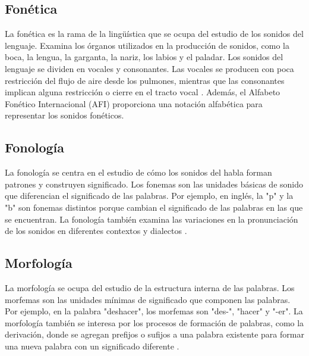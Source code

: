 \documentclass{book}
\begin{document}
\subsection{Fonética}

La fonética es la rama de la lingüística que se ocupa del estudio de los sonidos del lenguaje. Examina los órganos utilizados en la producción de sonidos, como la boca, la lengua, la garganta, la nariz, los labios y el paladar. Los sonidos del lenguaje se dividen en vocales y consonantes. Las vocales se producen con poca restricción del flujo de aire desde los pulmones, mientras que las consonantes implican alguna restricción o cierre en el tracto vocal \cite{JohnsonMLSS, fromkin2018introduction}. Además, el Alfabeto Fonético Internacional (AFI) proporciona una notación alfabética para representar los sonidos fonéticos.

\subsection{Fonología}

La fonología se centra en el estudio de cómo los sonidos del habla forman patrones y construyen significado. Los fonemas son las unidades básicas de sonido que diferencian el significado de las palabras. Por ejemplo, en inglés, la "p" y la "b" son fonemas distintos porque cambian el significado de las palabras en las que se encuentran. La fonología también examina las variaciones en la pronunciación de los sonidos en diferentes contextos y dialectos \cite{fromkin2018introduction}.

\subsection{Morfología}

La morfología se ocupa del estudio de la estructura interna de las palabras. Los morfemas son las unidades mínimas de significado que componen las palabras. Por ejemplo, en la palabra "deshacer", los morfemas son "des-", "hacer" y "-er". La morfología también se interesa por los procesos de formación de palabras, como la derivación, donde se agregan prefijos o sufijos a una palabra existente para formar una nueva palabra con un significado diferente \cite{JohnsonMLSS}.
\end{document}
